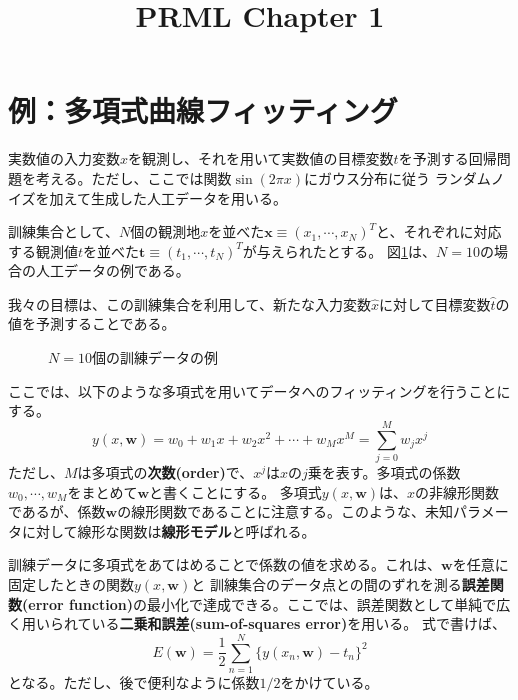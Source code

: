 \documentclass[a4paper,uplatex]{jsarticle}
\numberwithin{equation}{section}
\numberwithin{figure}{section}
\numberwithin{table}{section}
\begin{document}
\title{PRML Chapter 1}
\author{}
\date{}
\maketitle

\section{例：多項式曲線フィッティング}
実数値の入力変数\(x\)を観測し、それを用いて実数値の目標変数\(t\)を予測する回帰問題を考える。ただし、ここでは関数\(\sin(2\pi x)\)にガウス分布に従う
ランダムノイズを加えて生成した人工データを用いる。

訓練集合として、\(N\)個の観測地\(x\)を並べた\(\bm{x} \equiv (x_1,\cdots,x_N)^T\)と、それぞれに対応する観測値\(t\)を並べた\(\bm{t} \equiv (t_1,\cdots,t_N)^T\)が与えられたとする。
図\ref{fig:toy data}は、\(N=10\)の場合の人工データの例である。

我々の目標は、この訓練集合を利用して、新たな入力変数\(\hat{x}\)に対して目標変数\(\hat{t}\)の値を予測することである。

\begin{figure}[htbp]
  \centering
  
  \caption{\(N=10\)個の訓練データの例}
  \label{fig:toy data}
\end{figure}

ここでは、以下のような多項式を用いてデータへのフィッティングを行うことにする。
\begin{equation}
  y(x,\bm{w}) = w_0 + w_1 x + w_2 x^2 + \cdots + w_M x^M = \sum_{j=0}^{M} w_j x^j
\end{equation}
ただし、\(M\)は多項式の\textbf{次数(order)}で、\(x^j\)は\(x\)の\(j\)乗を表す。多項式の係数\(w_0,\cdots,w_M\)をまとめて\(\bm{w}\)と書くことにする。
多項式\(y(x,\bm{w})\)は、\(x\)の非線形関数であるが、係数\(\bm{w}\)の線形関数であることに注意する。このような、未知パラメータに対して線形な関数は\textbf{線形モデル}と呼ばれる。

訓練データに多項式をあてはめることで係数の値を求める。これは、\(\bm{w}\)を任意に固定したときの関数\(y(x,\bm{w})\)と
訓練集合のデータ点との間のずれを測る\textbf{誤差関数(error function)}の最小化で達成できる。ここでは、誤差関数として単純で広く用いられている\textbf{二乗和誤差(sum-of-squares error)}を用いる。
式で書けば、
\begin{equation}
  E(\bm{w}) = \frac{1}{2} \sum_{n=1}^{N} \{y(x_n,\bm{w}) - t_n\}^2
\end{equation}
となる。ただし、後で便利なように係数\(1/2\)をかけている。
\end{document}
